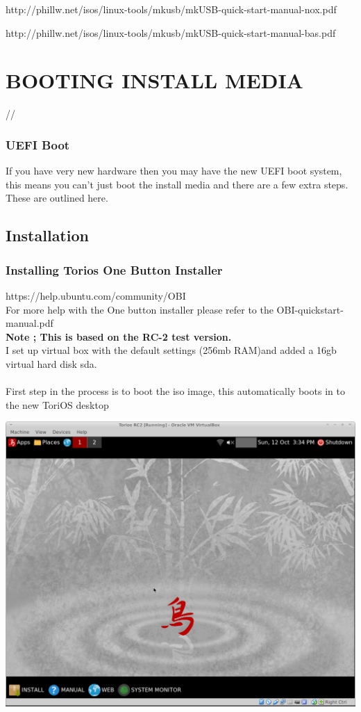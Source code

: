 \documentclass[12pt,a4paper]{book}
\begin{document}
http://phillw.net/isos/linux-tools/mkusb/mkUSB-quick-start-manual-nox.pdf

http://phillw.net/isos/linux-tools/mkusb/mkUSB-quick-start-manual-bas.pdf

\newpage 

\chapter{BOOTING INSTALL MEDIA}

 //

\subsection{UEFI Boot}
If you have very new hardware then you may have the new UEFI boot system,  this means you can't just boot the install media and there are a few extra steps.  These are outlined here.

\newpage

\section{Installation}

\subsection{Installing Torios One Button Installer}
https://help.ubuntu.com/community/OBI\\
For more help with the One button installer please refer to the OBI-quickstart-manual.pdf
\\
\textbf{Note ; This is based on the RC-2 test version.}
\linebreak \\
I set up virtual box with the default settings (256mb RAM)and added a 16gb virtual hard disk sda. \\
\\
First step in the process is to boot the iso image,  this automatically boots in to the new ToriOS desktop

\includegraphics[width=0.7\linewidth]{toriosRC2} 
\\
\end{document}

